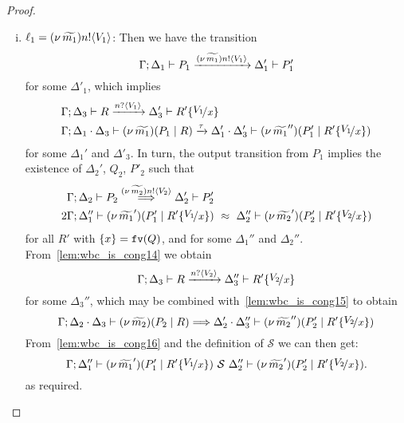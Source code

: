 \begin{proof}
\begin{enumerate}[I.]
\begin{enumerate}[1.]
\begin{enumerate}[i.]
				\item   $\ell_1 = {(\nu\, \widetilde{m_1}) n ! \langle V_1 \rangle}$: Then we have the transition
						$$
							\Gamma; \Delta_1 \vdash P_1 \xrightarrow{(\nu\, \widetilde{m_1}) n ! \langle V_1 \rangle} \Delta_1' \vdash P_1'
						$$
						for some $\Delta'_1$, 
						which implies
						\begin{eqnarray}
							 & \horel{\Gamma}{\Delta_3}{R}
							{\by{\bactinp{n}{V_1}}}{\Delta_3'}
							{R' \subst{V_1}{x}}
							\label{lem:wbc_is_cong14}\\
							 & \horel{\Gamma}{\Delta_1 \cat \Delta_3}{\newsp{\widetilde{m_1}}{P_1 \Par R}}
							{\by{\tau}}{\Delta_1' \cat \Delta_3'}
							{\newsp{\widetilde{m_1}''}{P_1' \Par R' \subst{V_1}{x}}}
						\end{eqnarray}
						for some $\Delta_1'$ and $\Delta'_3$.
				In turn, the output transition from $P_1$ implies the existence of $\Delta_2'$, $Q_2$, $P'_2$ such that
						\begin{eqnarray}
							&  \horel{\Gamma}{\Delta_2}{P_2}
							{\By{\news{\widetilde{m_2}} \bactout{n}{V_2}}}
							{\Delta_2'}{P_2'}
							\label{lem:wbc_is_cong15}\\2
							&  \horel{\Gamma}{\Delta_1''}{\newsp{\widetilde{m_1}'}{P_1' \Par R' \subst{V_1}{x}}}
							{\ \wbc\ }
							{\Delta_2''}{\newsp{\widetilde{m_2}'}{P_2' \Par R' \subst{V_2}{x}}}
							\label{lem:wbc_is_cong16}
						\end{eqnarray}
						 for all $R'$ with $\{x\} = \mathtt{fv}(Q)$, and for some $\Delta_1''$ and $\Delta_2''$.
						From~\eqref{lem:wbc_is_cong14} %
						we obtain 
						\[
							\horel{\Gamma}{\Delta_3}{R}{\by{\bactinp{n}{V_2}}}{\Delta_3''}{R' \subst{V_2}{x}}
						\]
						for some $\Delta_3''$, which may be combined with~\eqref{lem:wbc_is_cong15} to obtain
						\[
							\horel{\Gamma}{\Delta_2 \cat \Delta_3}{\newsp{\widetilde{m_2}}{P_2 \Par R}}
							{\By{}}
							{\Delta_2' \cat \Delta_3''}{\newsp{\widetilde{m_2}''}{P_2' \Par R' \subst{V_2}{x}}}
						\]
						From~\eqref{lem:wbc_is_cong16} and the definition of $\mathcal{S}$ we can then get:
						\[
							\horel{\Gamma}{\Delta_1''}{\newsp{\widetilde{m_1}'}{P_1' \Par R' \subst{V_1}{x}}}
							{\ \mathcal{S}\ }{ \Delta_2''}
							{\newsp{\widetilde{m_2}'}{P_2' \Par R' \subst{V_2}{x}}}.
						\]
						as required.
				

\end{enumerate}
\end{enumerate}
\end{enumerate}
\end{proof}
